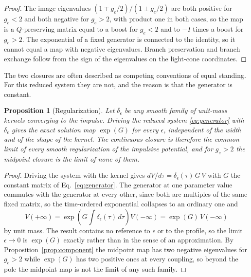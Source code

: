 \documentclass[aps,prd,reprint,nofootinbib]{revtex4-2}
\newtheorem{proposition}{Proposition}
\begin{document}
\begin{proof}
The image eigenvalues $(1 \mp g_{e}/2)/(1 \pm g_{e}/2)$ are both
positive for $g_{e} < 2$ and both negative for $g_{e} > 2$, with product
one in both cases, so the map is a $Q$-preserving matrix equal to a
boost for $g_{e} < 2$ and to $-I$ times a boost for $g_{e} > 2$.  The
exponential of a fixed generator is connected to the identity, so it
cannot equal a map with negative eigenvalues.  Branch preservation and
branch exchange follow from the sign of the eigenvalues on the
light-cone coordinates.
\end{proof}

The two closures are often described as competing conventions of equal
standing.  For this reduced system they are not, and the reason is that
the generator is constant.

\begin{proposition}[Regularization]
\label{prop:regular}
Let $\delta_{\epsilon}$ be any smooth family of unit-mass kernels
converging to the impulse.  Driving the reduced system
\eqref{eq:generator} with $\delta_{\epsilon}$ gives the exact solution
map $\exp(G)$ for every $\epsilon$, independent of the width and of the
shape of the kernel.  The continuous closure is therefore the common
limit of every smooth regularization of the impulsive potential, and
for $g_{e} > 2$ the midpoint closure is the limit of none of them.
\end{proposition}

\begin{proof}
Driving the system with the kernel gives
$dV/d\tau = \delta_{\epsilon}(\tau)\, G\, V$ with $G$ the constant
matrix of Eq.~\eqref{eq:generator}.  The generator at one parameter
value commutes with the generator at every other, since both are
multiples of the same fixed matrix, so the time-ordered exponential
collapses to an ordinary one and
\begin{equation*}
V(+\infty)
= \exp\!\left(G \int \delta_{\epsilon}(\tau)\, d\tau\right) V(-\infty)
= \exp(G)\, V(-\infty)
\end{equation*}
by unit mass.  The result contains no reference to $\epsilon$ or to the
profile, so the limit $\epsilon \to 0$ is $\exp(G)$ exactly rather than
in the sense of an approximation.  By
Proposition~\ref{prop:component} the midpoint map has two negative
eigenvalues for $g_{e} > 2$ while $\exp(G)$ has two positive ones at
every coupling, so beyond the pole the midpoint map is not the limit of
any such family.
\end{proof}
\end{document}
